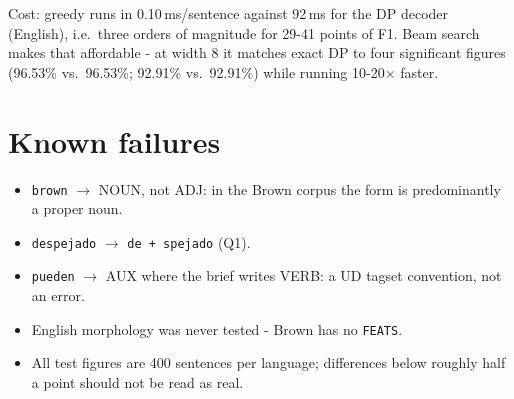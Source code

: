 \documentclass[11pt,a4paper]{article}
\begin{document}
\medskip\noindent Cost: greedy runs in 0.10\,ms/sentence against 92\,ms for the
DP decoder (English), i.e.\ three orders of magnitude for 29-41 points of F1.
Beam search makes that affordable - at width 8 it matches exact DP to four
significant figures (96.53\% vs.\ 96.53\%; 92.91\% vs.\ 92.91\%) while running
10-20$\times$ faster.

\section*{Known failures}

\begin{itemize}\itemsep2pt
\item \texttt{brown} $\rightarrow$ NOUN, not ADJ: in the Brown corpus the form is
predominantly a proper noun.
\item \texttt{despejado} $\rightarrow$ \texttt{de + spejado} (Q1).
\item \texttt{pueden} $\rightarrow$ AUX where the brief writes VERB: a UD tagset
convention, not an error.
\item English morphology was never tested - Brown has no \texttt{FEATS}.
\item All test figures are 400 sentences per language; differences below roughly
half a point should not be read as real.
\end{itemize}
\end{document}
